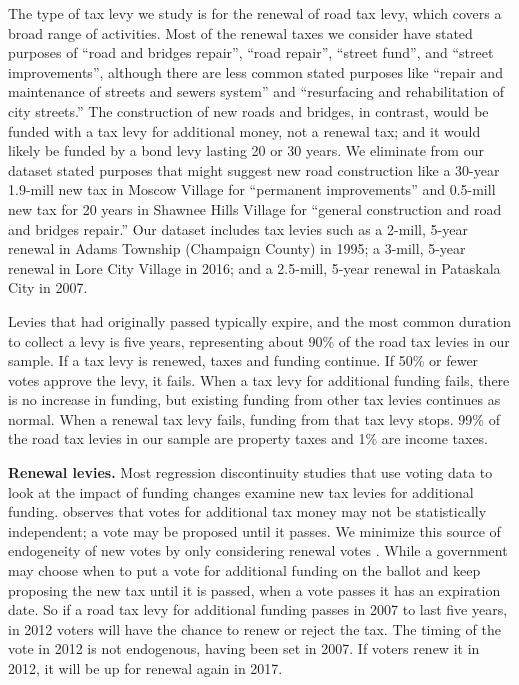 The type of tax levy we study is for the renewal of road tax levy, which covers a broad range of activities. Most of the renewal taxes we consider have stated purposes of “road and bridges repair”, “road repair”, “street fund”, and “street improvements”, although there are less common stated purposes like “repair and maintenance of streets and sewers system” and “resurfacing and rehabilitation of city streets.”  The construction of new roads and bridges, in contrast, would be funded with a tax levy for additional money, not a renewal tax; and it would likely be funded by a bond levy lasting 20 or 30 years.  We eliminate from our dataset stated purposes that might suggest new road construction like a 30-year 1.9-mill new tax in Moscow Village for “permanent improvements” and 0.5-mill new tax for 20 years in Shawnee Hills Village for “general construction and road and bridges repair.” Our dataset includes tax levies such as a 2-mill, 5-year renewal in Adams Township (Champaign County) in 1995; a 3-mill, 5-year renewal in Lore City Village in 2016; and a 2.5-mill, 5-year renewal in Pataskala City in 2007.

\noindent Levies that had originally passed typically expire, and the most common duration to collect a levy is five years, representing about 90\% of the road tax levies in our sample.  If a tax levy is renewed, taxes and funding continue.  If 50\% or fewer votes approve the levy, it fails.  When a tax levy for additional funding fails, there is no increase in funding, but existing funding from other tax levies continues as normal.  When a renewal tax levy fails, funding from that tax levy stops.  99\% of the road tax levies in our sample are property taxes and 1\% are income taxes.

{\bf Renewal levies.} Most regression discontinuity studies that use voting data to look at the impact of funding changes examine new tax levies for additional funding.  \cite{cellini2010value} observes that votes for additional tax money may not be statistically independent; a vote may be proposed until it passes.  We minimize this source of endogeneity of new votes by only considering renewal votes \citep{brasington2017school}.  While a government may choose when to put a vote for additional funding on the ballot and keep proposing the new tax until it is passed, when a vote passes it has an expiration date.  So if a road tax levy for additional funding passes in 2007 to last five years, in 2012 voters will have the chance to renew or reject the tax.  The timing of the vote in 2012 is not endogenous, having been set in 2007.  If voters renew it in 2012, it will be up for renewal again in 2017. 

